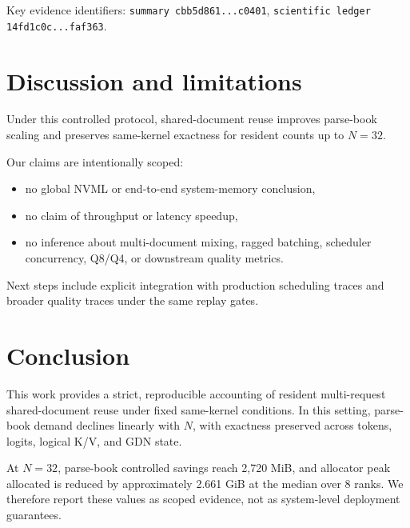 \documentclass{article}
\begin{document}
Key evidence identifiers:
\texttt{summary cbb5d861...c0401},
\texttt{scientific ledger 14fd1c0c...faf363}.
\section{Discussion and limitations}
Under this controlled protocol, shared-document reuse improves parse-book scaling and preserves same-kernel exactness for resident counts up to $N=32$.

Our claims are intentionally scoped:
\begin{itemize}
  \item no global NVML or end-to-end system-memory conclusion,
  \item no claim of throughput or latency speedup,
  \item no inference about multi-document mixing, ragged batching, scheduler concurrency, Q8/Q4, or downstream quality metrics.
\end{itemize}

Next steps include explicit integration with production scheduling traces and broader quality traces under the same replay gates.

\section{Conclusion}
This work provides a strict, reproducible accounting of resident multi-request shared-document reuse under fixed same-kernel conditions. In this setting, parse-book demand declines linearly with $N$, with exactness preserved across tokens, logits, logical K/V, and GDN state.

At $N=32$, parse-book controlled savings reach 2,720 MiB, and allocator peak allocated is reduced by approximately 2.661 GiB at the median over 8 ranks. We therefore report these values as scoped evidence, not as system-level deployment guarantees.


\end{document}

